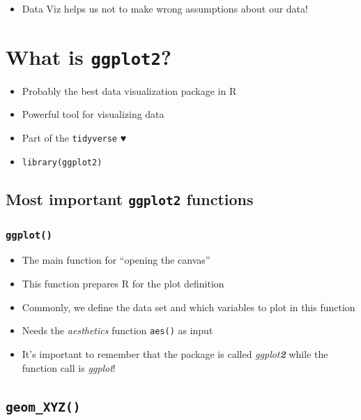 \documentclass[
]{book}
\providecommand{\tightlist}{%
  \setlength{\itemsep}{0pt}\setlength{\parskip}{0pt}}
\begin{document}
\begin{itemize}
\tightlist
\item
  Data Viz helps us not to make wrong assumptions about our data!
\end{itemize}

\section{\texorpdfstring{What is \texttt{ggplot2}?}{What is ggplot2?}}\label{what-is-ggplot2}

\begin{itemize}
\item
  Probably the best data visualization package in R
\item
  Powerful tool for visualizing data
\item
  Part of the \texttt{tidyverse} ♥
\end{itemize}

\begin{itemize}
\tightlist
\item
  \texttt{library(ggplot2)}
\end{itemize}

\subsection{\texorpdfstring{Most important \texttt{ggplot2} functions}{Most important ggplot2 functions}}\label{most-important-ggplot2-functions}

\subsubsection{\texorpdfstring{\texttt{ggplot()}}{ggplot()}}\label{ggplot}

\begin{itemize}
\tightlist
\item
  The main function for ``opening the canvas''
\item
  This function prepares R for the plot definition
\item
  Commonly, we define the data set and which variables to plot in this function
\item
  Needs the \emph{aesthetics} function \texttt{aes()} as input
\item
  It's important to remember that the package is
  called \emph{ggplot\textbf{2}} while the function call is \emph{ggplot}!
\end{itemize}

\subsection{\texorpdfstring{\texttt{geom\_XYZ()}}{geom\_XYZ()}}\label{geom_xyz}
\end{document}

